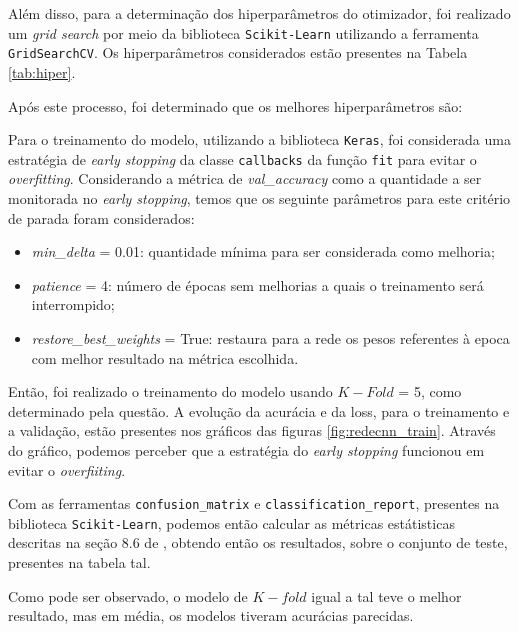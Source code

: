 \documentclass[]{abntex2}
\begin{document}
Além disso, para a determinação dos hiperparâmetros do otimizador, foi realizado um \textit{grid search} por meio da biblioteca \texttt{Scikit-Learn} utilizando a ferramenta \texttt{GridSearchCV}. Os hiperparâmetros considerados estão presentes na Tabela \ref{tab:hiper}.

Após este processo, foi determinado que os melhores hiperparâmetros são:


Para o treinamento do modelo, utilizando a biblioteca \texttt{Keras}, foi considerada uma estratégia de \textit{early stopping} da classe \texttt{callbacks} da função \texttt{fit} para evitar o \textit{overfitting}. Considerando a métrica de \textit{val\_accuracy}  como a quantidade a ser monitorada no \textit{early stopping}, temos que os seguinte parâmetros para este critério de parada foram considerados:

\begin{itemize}
    \item \textit{min\_delta} = 0.01:  quantidade mínima para ser considerada como melhoria;
    \item \textit{patience} = 4: número de épocas sem melhorias a quais o treinamento será interrompido;
    \item \textit{restore\_best\_weights} = True: restaura para a rede os pesos referentes à epoca com melhor resultado na métrica escolhida.
\end{itemize}

Então, foi realizado o treinamento do modelo usando $K-Fold$ = 5, como determinado pela questão. A evolução da acurácia e da loss, para o treinamento e a validação, estão presentes nos gráficos das figuras \ref*{fig:redecnn_train}. Através do gráfico, podemos perceber que a estratégia do \textit{early stopping} funcionou em evitar o \textit{overfiiting}.

Com as ferramentas \texttt{confusion\_matrix} e \texttt{classification\_report}, presentes na biblioteca \texttt{Scikit-Learn}, podemos então calcular as métricas estátisticas descritas na seção 8.6 de \cite{book}, obtendo então os resultados, sobre o conjunto de teste, presentes na tabela tal.

Como pode ser observado, o modelo de $K-fold$ igual a tal teve o melhor resultado, mas em média, os modelos tiveram acurácias parecidas.
\end{document}
